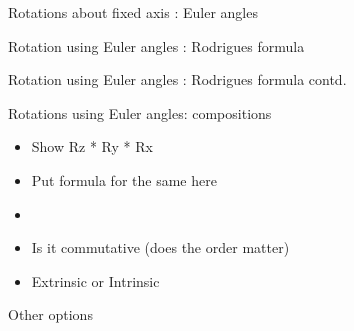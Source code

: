 \documentclass[presentation]{beamer}
\begin{document}
\begin{frame}[label={sec:orga821671}]{Rotations about fixed axis : Euler angles}
\end{frame}
\begin{frame}[label={sec:orgfb2143c}]{Rotation using Euler angles : Rodrigues formula}
\end{frame}
\begin{frame}[label={sec:org835f096}]{Rotation using Euler angles : Rodrigues formula contd.}
\end{frame}
\begin{frame}[label={sec:orge779989}]{Rotations using Euler angles: compositions}
\begin{itemize}
\item Show Rz * Ry * Rx
\item Put formula for the same here
\item

\item Is it commutative (does the order matter)
\item Extrinsic or Intrinsic
\end{itemize}
\end{frame}
\begin{frame}[label={sec:orgcf97ca7}]{Other options}
\end{frame}
\end{document}

